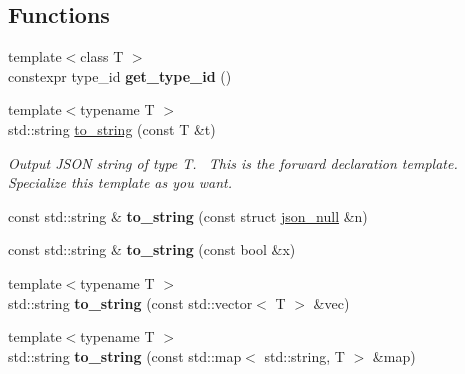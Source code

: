 \subsection*{Functions}
\begin{DoxyCompactItemize}
\item 
\hypertarget{namespace_simple_j_s_o_n_aff00ccbee484229810cab53aa25a674a}{{\footnotesize template$<$class T $>$ }\\constexpr type\+\_\+id {\bfseries get\+\_\+type\+\_\+id} ()}\label{namespace_simple_j_s_o_n_aff00ccbee484229810cab53aa25a674a}

\item 
{\footnotesize template$<$typename T $>$ }\\std\+::string \hyperlink{namespace_simple_j_s_o_n_a8cd3ef0c756ad0c7326c478e375a33d8}{to\+\_\+string} (const T \&t)
\begin{DoxyCompactList}\small\item\em Output J\+S\+O\+N string of type T.~\newline
 This is the forward declaration template.~\newline
 Specialize this template as you want.~\newline
 \end{DoxyCompactList}\item 
\hypertarget{namespace_simple_j_s_o_n_a2e8ae1d00af3315d6fda00d40b70bc3e}{const std\+::string \& {\bfseries to\+\_\+string} (const struct \hyperlink{struct_simple_j_s_o_n_1_1json__null}{json\+\_\+null} \&n)}\label{namespace_simple_j_s_o_n_a2e8ae1d00af3315d6fda00d40b70bc3e}

\item 
\hypertarget{namespace_simple_j_s_o_n_abeeb0badab36a433faf5ed945fde5888}{const std\+::string \& {\bfseries to\+\_\+string} (const bool \&x)}\label{namespace_simple_j_s_o_n_abeeb0badab36a433faf5ed945fde5888}

\item 
\hypertarget{namespace_simple_j_s_o_n_ad03445df6771a5c6c44599ac319aece1}{{\footnotesize template$<$typename T $>$ }\\std\+::string {\bfseries to\+\_\+string} (const std\+::vector$<$ T $>$ \&vec)}\label{namespace_simple_j_s_o_n_ad03445df6771a5c6c44599ac319aece1}

\item 
\hypertarget{namespace_simple_j_s_o_n_abc6161e4721d5e45dadc3090d302eeab}{{\footnotesize template$<$typename T $>$ }\\std\+::string {\bfseries to\+\_\+string} (const std\+::map$<$ std\+::string, T $>$ \&map)}\label{namespace_simple_j_s_o_n_abc6161e4721d5e45dadc3090d302eeab}


\end{DoxyCompactItemize}

